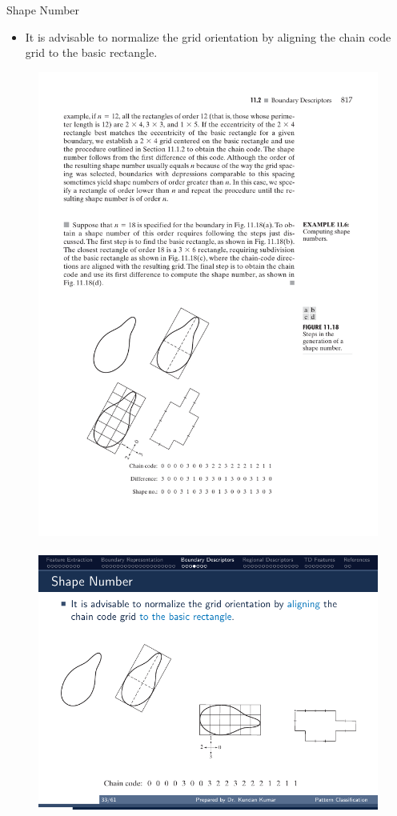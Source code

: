 \begin{frame}{Shape Number}
\begin{itemize}
\item It is advisable to normalize the grid orientation by {\color{mycolor4}aligning} the chain code grid {\color{mycolor4}to the basic rectangle}.
\end{itemize}
\begin{figure}
\includegraphics[scale=0.7]{Figures/Feature05}~~
\includegraphics[scale=1]{Figures/Feature05e}~~

\end{figure}
\end{frame}
